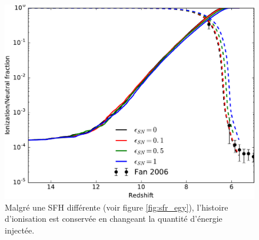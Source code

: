\begin{figure}
        \includegraphics[width=.95\textwidth]{img/03/sneff_xion.pdf} 
        \caption[Fonction d'ionisation en fonction de la quantité d'énergie injectée]{Malgré une SFH différente (voir figure \ref{fig:sfr_egy}), l'histoire d'ionisation est conservée en changeant la quantité d'énergie injectée.
        }
 		\label{fig:xion_sneff}
\end{figure}




%
